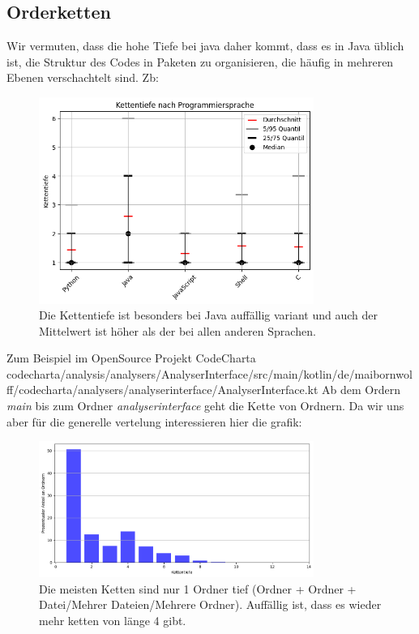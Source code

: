 \subsection{Orderketten} \label{sec:OrderKetten}
Wir vermuten, dass die hohe Tiefe bei java daher kommt, dass es in Java üblich ist, die Struktur des Codes in Paketen zu organisieren, die häufig in mehreren Ebenen verschachtelt sind. Zb: 
\begin{figure}
    \centering
    \includegraphics[width=0.8\textwidth]{images/datenanalyse/spracheVsKettentiefe.png}
    \caption{Die Kettentiefe ist besonders bei Java auffällig variant und auch der Mittelwert ist höher als der bei allen anderen Sprachen.}
\end{figure}
Zum Beispiel im OpenSource Projekt CodeCharta \cite{code_charta_github}
codecharta/analysis/analysers/AnalyserInterface/src/main/kotlin/de/maibornwolff/codecharta/analysers/analyserinterface/AnalyserInterface.kt
Ab dem Ordern \textit{main} bis zum Ordner \textit{analyserinterface} geht die Kette von Ordnern.
Da wir uns aber für die generelle vertelung interessieren hier die grafik:
\begin{figure}
    \centering
    \includegraphics[width=0.8\textwidth]{images/datenanalyse/kettentiefe.png}
    \caption{Die meisten Ketten sind nur 1 Ordner tief (Ordner + Ordner + Datei/Mehrer Dateien/Mehrere Ordner). Auffällig ist, dass es wieder mehr ketten von länge 4 gibt.}
    \label{fig:kettentiefe}
\end{figure}
